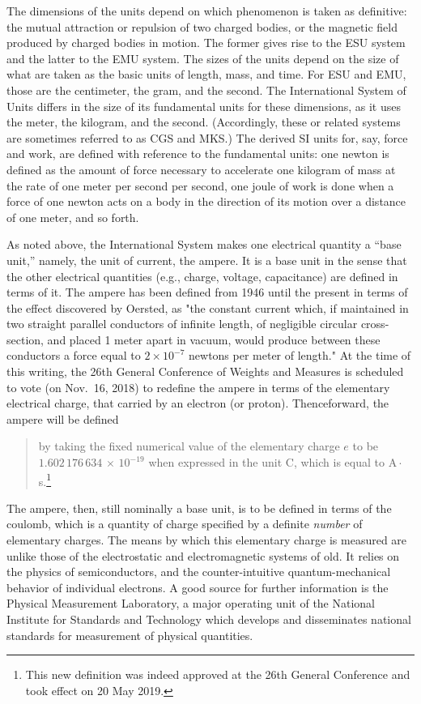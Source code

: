 The dimensions of the units depend on which phenomenon is taken as definitive: 
the mutual attraction or repulsion of two charged bodies, or the magnetic field 
produced by charged bodies in motion. The former gives rise to the ESU system
and the latter to the EMU system. The sizes of the units depend on the size of
what are taken as the basic units of length, mass, and time. For ESU and EMU,
those are the centimeter, the gram, and the second. The International System
of Units differs in the size of its fundamental units for these dimensions, as
it uses the meter, the kilogram, and the second. (Accordingly, these or related
systems are sometimes referred to as CGS and MKS.) The derived SI units for, say, 
force and work, are defined with reference to the fundamental units: one newton 
is defined as the amount of force necessary to accelerate one kilogram of mass 
at the rate of one meter per second per second, one joule of work is done when a 
force of one newton acts on a body in the direction of its motion over a distance 
of one meter, and so forth.

As noted above, the International System makes one electrical quantity a ``base unit,'' 
namely, the unit of current, the ampere. It is a base unit in the sense that the other
electrical quantities (e.g., charge, voltage, capacitance) are defined in terms of it. The ampere
has been defined from 1946 until the present in terms of the effect discovered by 
Oersted, as "the constant current which, 
if maintained in two straight parallel conductors of infinite length, of 
negligible circular cross-section, and placed 1 meter apart in vacuum, would produce 
between these conductors a force equal to $2 \times 10^{-7}$ newtons per meter 
of length." At the time of this writing, the 26th General Conference of Weights
and Measures is scheduled to vote (on Nov.\ 16, 2018) to redefine the ampere
in terms of the elementary electrical charge, that carried by an electron (or proton).
Thenceforward, the ampere will be defined 
\begin{quote}
by taking the fixed numerical value of the elementary charge $e$ to be $1.602\, 176\, 634\, 
\times \, 10^{-19}$ when expressed in the unit C, which is equal to A\,$\cdot$\,s.\footnote{This new
definition was indeed approved at the 26th General Conference and took effect on 20 May 2019.}
\end{quote}
The ampere, then, still nominally a base unit, is to be defined in terms of the coulomb, 
which is a quantity of charge specified by a definite \emph{number} of elementary charges.
The means by which this elementary charge is measured are unlike those of the
electrostatic and electromagnetic systems of old. It relies on the physics of semiconductors,
and the counter-intuitive quantum-mechanical behavior of individual electrons. A good source
for further information is the Physical Measurement Laboratory, a major operating unit of the 
National Institute for Standards and Technology which develops and disseminates national
standards for measurement of physical quantities.


